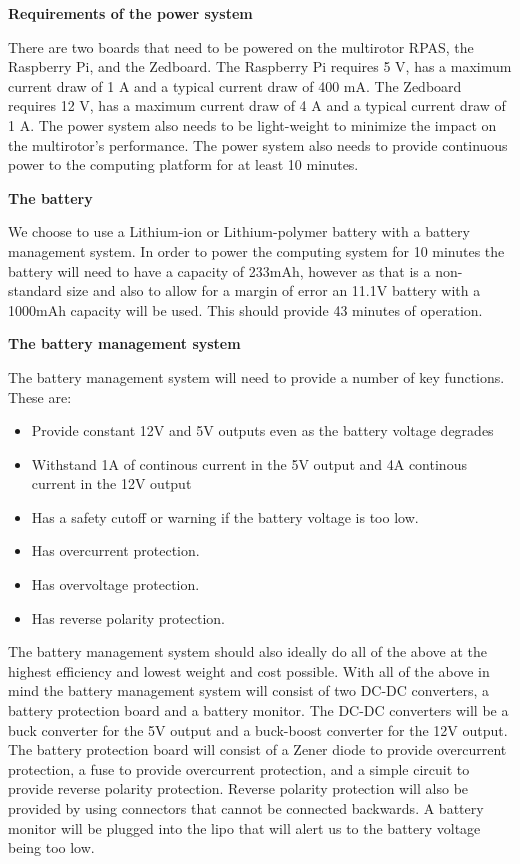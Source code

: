 \textbf{Requirements of the power system}

 There are two boards that need to be powered on the multirotor RPAS, the Raspberry Pi, and the Zedboard. The Raspberry Pi requires
5 V, has a maximum current draw of 1 A and a typical current draw of 400 mA. The Zedboard requires 12 V, has a maximum current draw of
4 A and a typical current draw of 1 A. The power system also
needs to be light-weight to minimize the impact on the multirotor's performance. The power system also needs to provide continuous power to the computing platform for at least 10 minutes.

\textbf{The battery}

We choose to use a Lithium-ion or Lithium-polymer battery with a battery management system. In order to
power the computing system for 10 minutes the battery will need to have a capacity of 233mAh, however as that is a non-standard size and also to allow for a margin of error an 11.1V battery with a 1000mAh capacity will be used. This should provide 43 minutes of operation.

\textbf{The battery management system}

The battery management system will need to provide a number of key functions. These are:
  
  \begin{itemize}
\item Provide constant 12V and 5V outputs even as the battery voltage degrades
\item Withstand 1A of continous current in the 5V output and 4A continous current in the 12V output
\item Has a safety cutoff or warning if the battery voltage is too low.
\item Has overcurrent protection.
\item Has overvoltage protection.
\item Has reverse polarity protection.
\end{itemize}
 
The battery management system should also ideally do all of the above at the highest efficiency and lowest weight and cost possible. With all of the above in mind the battery management system will consist of two DC-DC converters, a battery protection board and a battery monitor. The DC-DC converters will be a buck converter for the 5V output and a buck-boost converter for the 12V output. The battery protection board will consist of a Zener diode to provide overcurrent protection, a fuse to provide overcurrent protection, and a simple circuit to provide reverse polarity protection. Reverse polarity protection will also be provided by using connectors that cannot be connected backwards. A battery monitor will be plugged into the lipo that will alert us to the battery voltage being too low.

